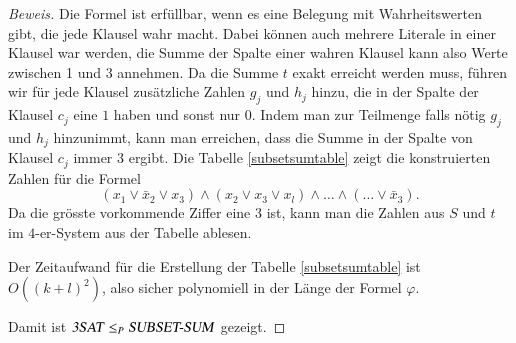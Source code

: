 \begin{proof}[Beweis]
Die Formel ist erfüllbar, wenn es eine Belegung mit Wahrheitswerten
gibt, die jede Klausel wahr macht.
Dabei können auch mehrere Literale
in einer Klausel war werden, die Summe der Spalte einer wahren Klausel kann
also Werte zwischen 1 und 3 annehmen.
Da die Summe $t$ exakt erreicht
werden muss, führen wir für jede Klausel zusätzliche Zahlen $g_j$ und
$h_j$ hinzu, die in der Spalte der Klausel $c_j$ eine $1$ haben und sonst
nur $0$.
Indem man zur Teilmenge falls nötig $g_j$ und $h_j$ hinzunimmt,
kann man erreichen, dass die Summe in der Spalte von Klausel $c_j$ immer
$3$ ergibt.
Die Tabelle \ref{subsetsumtable} zeigt die konstruierten Zahlen
für die Formel
\[
(x_1\vee \bar x_2\vee x_3)\wedge(x_2\vee x_3\vee x_l)\wedge \dots\wedge
(\dots\vee \bar x_3).
\]
Da die grösste vorkommende Ziffer eine $3$ ist, kann man die
Zahlen aus $S$  und $t$ im $4$-er-System aus der Tabelle ablesen.

Der Zeitaufwand für die Erstellung der Tabelle \ref{subsetsumtable}
ist $O((k+l)^2)$, also sicher polynomiell in der Länge der
Formel $\varphi$.

Damit ist 
$\text{\textsl{3SAT}}\le_P\text{\textsl{SUBSET-SUM}}$ gezeigt.
\end{proof}


